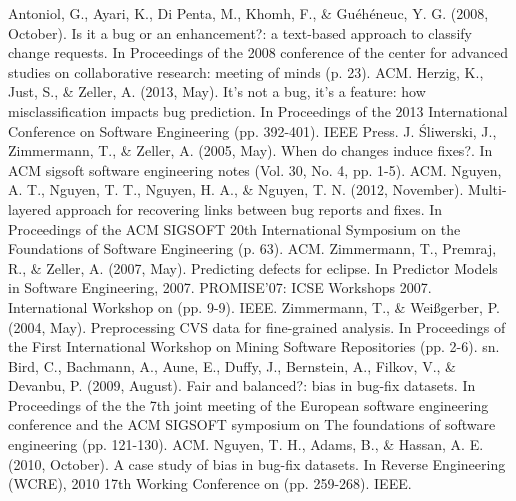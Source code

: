 \documentclass[runningheads,a4paper]{llncs}
\begin{document}
\begin{thebibliography}{4}

Antoniol, G., Ayari, K., Di Penta, M., Khomh, F., \& Gu\'eh\'eneuc, Y. G. (2008, October). Is it a bug or an enhancement?: a text-based approach to classify change requests. In Proceedings of the 2008 conference of the center for advanced studies on collaborative research: meeting of minds (p. 23). ACM.
Herzig, K., Just, S., \& Zeller, A. (2013, May). It's not a bug, it's a feature: how misclassification impacts bug prediction. In Proceedings of the 2013 International Conference on Software Engineering (pp. 392-401). IEEE Press.
J. Śliwerski, J., Zimmermann, T., \& Zeller, A. (2005, May). When do changes induce fixes?. In ACM sigsoft software engineering notes (Vol. 30, No. 4, pp. 1-5). ACM.
Nguyen, A. T., Nguyen, T. T., Nguyen, H. A., \& Nguyen, T. N. (2012, November). Multi-layered approach for recovering links between bug reports and fixes. In Proceedings of the ACM SIGSOFT 20th International Symposium on the Foundations of Software Engineering (p. 63). ACM.
Zimmermann, T., Premraj, R., \& Zeller, A. (2007, May). Predicting defects for eclipse. In Predictor Models in Software Engineering, 2007. PROMISE'07: ICSE Workshops 2007. International Workshop on (pp. 9-9). IEEE.
Zimmermann, T., \& Weißgerber, P. (2004, May). Preprocessing CVS data for fine-grained analysis. In Proceedings of the First International Workshop on Mining Software Repositories (pp. 2-6). sn.
Bird, C., Bachmann, A., Aune, E., Duffy, J., Bernstein, A., Filkov, V., \& Devanbu, P. (2009, August). Fair and balanced?: bias in bug-fix datasets. In Proceedings of the the 7th joint meeting of the European software engineering conference and the ACM SIGSOFT symposium on The foundations of software engineering (pp. 121-130). ACM.
Nguyen, T. H., Adams, B., \& Hassan, A. E. (2010, October). A case study of bias in bug-fix datasets. In Reverse Engineering (WCRE), 2010 17th Working Conference on (pp. 259-268). IEEE.
\end{thebibliography}
\end{document}
